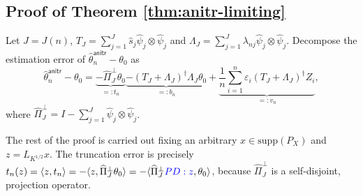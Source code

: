 \documentclass[11pt,a4paper]{article}
\renewcommand{\hat}{\widehat}
\theoremstyle{definition}
\theoremstyle{plain}
\theoremstyle{remark}
\newcommand{\supp}{\mathrm{supp}}
\newcommand{\ud}{\mathrm d}
\newcommand{\anitr}{\mathsf{anitr}}
\newcommand{\pd}[1]{
	{ \color{blue} PD: #1}
}
\begin{document}

\subsection{Proof of Theorem \ref{thm:anitr-limiting}}

Let $J=J(n)$, $T_J=\sum_{j=1}^J \hat s_j\hat\psi_j\otimes \hat\psi_j$ and $\Lambda_J=\sum_{j=1}^J\lambda_{nj}\hat\psi_j\otimes\hat\psi_j$.
Decompose the estimation error of $\hat\theta_n^\anitr-\theta_0$ as
\begin{equation}
\hat\theta_n^\anitr-\theta_0 = \underbrace{-\hat\Pi_J^\perp\theta_0}_{=:t_n} \underbrace{-(T_J+\Lambda_J)^\dagger \Lambda_J\theta_0}_{=: b_n} + \underbrace{\frac{1}{n}\sum_{i=1}^n\varepsilon_i (T_J+\Lambda_J)^\dagger Z_i}_{=:v_n},
\label{eq:anitr-decomp}
\end{equation}
where $\hat\Pi_J^\perp = I - \sum_{j=1}^J\hat\psi_j\otimes\hat\psi_j$.

The rest of the proof is carried out fixing an arbitrary $x\in\supp(P_X)$ and $z=L_{K^{1/2}}x$. 
The truncation error is precisely $t_n(z)=\langle z, t_n\rangle = -\langle z, \hat\Pi_J^\perp\theta_0\rangle = -\langle \hat\Pi_J^\perp \pd{z},\theta_0\rangle$, 
because $\hat\Pi_J^\perp$ is a self-disjoint, projection operator.
\end{document}
